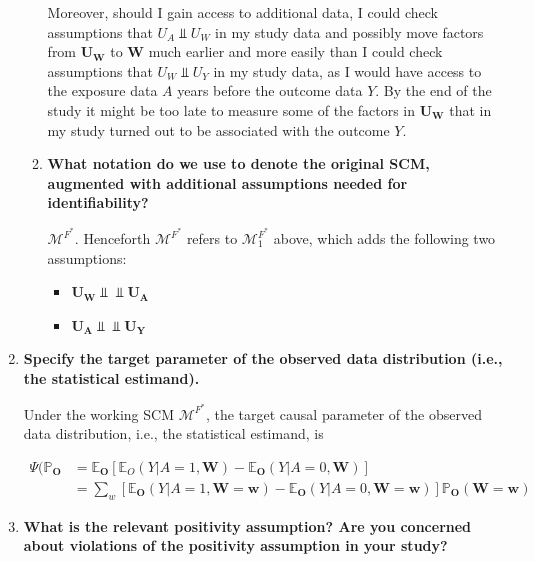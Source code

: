 \documentclass{article}\usepackage[]{graphicx}\usepackage[]{xcolor}
\begin{document}
\begin{enumerate}[label=\textbf{\arabic*.}]
\begin{enumerate}[label=\textbf{(\alph*)}]
Moreover, should I gain access to additional data, I could check assumptions that $U_A \Perp U_W$ in my study data and possibly move factors from $\bm{U_W}$ to $\bm{W}$ much earlier and more easily than I could check assumptions that $U_W \Perp U_Y$ in my study data, as I would have access to the exposure data $A$ years before the outcome data $Y$. By the end of the study it might be too late to measure some of the factors in $\bm{U_W}$ that in my study turned out to be associated with the outcome $Y$.
    
    \item \textbf{What notation do we use to denote the original SCM, augmented with additional assumptions needed for identifiability?}
    
    $\mathcal{M}^{F^*}$. Henceforth $\mathcal{M}^{F^*}$ refers to $\mathcal{M}^{F^*}_1$ above, which adds the following two assumptions:
    
    \begin{itemize}
      \item $\bm{U_W} \Perp \!\!\!\! \Perp \bm{U_A}$
      \item $\bm{U_A} \Perp \!\!\!\! \Perp \bm{U_Y}$
    \end{itemize}
    
  \end{enumerate}
  
  \item \textbf{Specify the target parameter of the observed data distribution (i.e., the statistical estimand).}
  
Under the working SCM $\mathcal{M}^{F^*}$, the target causal parameter of the observed data distribution, i.e., the statistical estimand, is 
  
\begin{align*}
\Psi(\mathbb{P}_{\bm{O}} &= \mathbb{E}_{\bm{O}}[\mathbb{E}_O(Y|A=1,\bm{W}) - \mathbb{E}_{\bm{O}}(Y|A=0,\bm{W})] \\
&= \sum_{w}[\mathbb{E}_{\bm{O}}(Y|A=1,\bm{W}=\bm{w}) - \mathbb{E}_{\bm{O}}(Y|A=0,\bm{W}=\bm{w})]\mathbb{P}_{\bm{O}}(\bm{W}=\bm{w})
\end{align*}
  
  \item \textbf{What is the relevant positivity assumption? Are you concerned about violations of the positivity assumption in your study?}
  

\end{enumerate}
\end{document}
